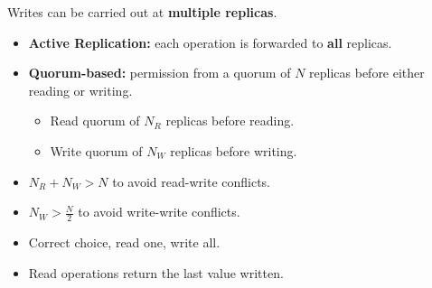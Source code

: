 \documentclass[a4paper, 10pt, twocolumn]{article}
\begin{document}
    Writes can be carried out at \textbf{multiple replicas}.
    \begin{itemize}
        \item \textbf{Active Replication:} each operation is forwarded to \textbf{all} replicas.
        \item \textbf{Quorum-based:} permission from a quorum of $N$ replicas before either reading or writing.
        \begin{itemize}
            \item Read quorum of $N_R$ replicas before reading.
            \item Write quorum of $N_W$ replicas before writing.
        \end{itemize}
        \item $N_R + N_W > N$ to avoid read-write conflicts.
        \item $N_W > \frac{N}{2}$ to avoid write-write conflicts.
        \item Correct choice, read one, write all.
        \item Read operations return the last value written.
    \end{itemize}
\end{document}
